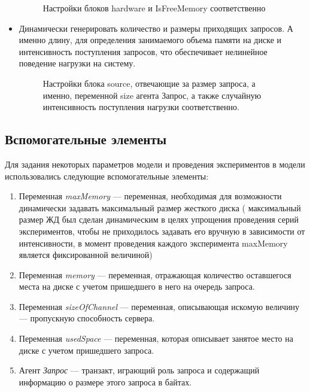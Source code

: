 \begin{itemize}
    \begin{figure} [h]
        \caption{Настройки блоков hardware и IsFreeMemory соответственно}
    \end{figure}

    \item Динамически генерировать количество и размеры приходящих запросов. А
    именно длину, для определения занимаемого объема памяти на диске и интенсивность
    поступления запросов, что обеспечивает нелинейное поведение нагрузки на систему.
    \begin{figure} [h]
        \caption{Настройки блока source, отвечающие за размер запроса, а именно,
        переменной size агента Запрос, а также случайную интенсивность поступления
        нагрузки соответственно.}
    \end{figure}
\end{itemize}

\newpage
\subsection{Вспомогательные элементы}
Для задания некоторых параметров модели и проведения экспериментов в модели использовались следующие вспомогательные элементы:
\begin{enumerate}
    \item Переменная \textit{maxMemory} --- переменная, необходимая для возможности динамически задавать максимальный размер жесткого диска (
    максимальный размер ЖД был сделан динамическим в целях упрощения проведения серий экспериментов, чтобы не приходилось задавать его вручную
    в зависимости от интенсивности, в момент проведения каждого эксперимента maxMemory является фиксированной величиной)
    \item Переменная \textit{memory} --- переменная, отражающая количество оставшегося места на диске с учетом пришедшего в него на очередь запроса.
    \item Переменная \textit{sizeOfChannel} --- переменная, описывающая искомую величину --- пропускную способность сервера.
    \item Переменная \textit{usedSpace} --- переменная, которая описывает занятое место на диске с учетом пришедшего запроса.
    \item Агент \textit{Запрос} --- транзакт, играющий роль запроса и содержащий информацию о размере этого запроса в байтах.
\end{enumerate}

